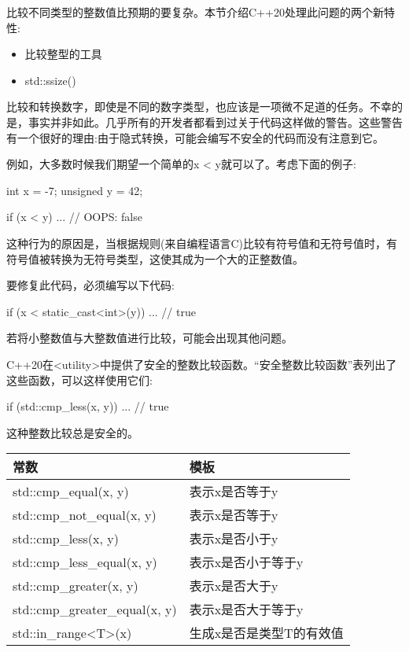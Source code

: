 
比较不同类型的整数值比预期的要复杂。本节介绍C++20处理此问题的两个新特性:

\begin{itemize}
\item 
比较整型的工具

\item 
std::ssize()
\end{itemize}


比较和转换数字，即使是不同的数字类型，也应该是一项微不足道的任务。不幸的是，事实并非如此。几乎所有的开发者都看到过关于代码这样做的警告。这些警告有一个很好的理由:由于隐式转换，可能会编写不安全的代码而没有注意到它。

例如，大多数时候我们期望一个简单的x < y就可以了。考虑下面的例子:

\begin{cpp}
int x = -7;
unsigned y = 42;

if (x < y) ... // OOPS: false
\end{cpp}

这种行为的原因是，当根据规则(来自编程语言C)比较有符号值和无符号值时，有符号值被转换为无符号类型，这使其成为一个大的正整数值。

要修复此代码，必须编写以下代码:

\begin{cpp}
if (x < static_cast<int>(y)) ... // true
\end{cpp}

若将小整数值与大整数值进行比较，可能会出现其他问题。

C++20在<utility>中提供了安全的整数比较函数。“安全整数比较函数”表列出了这些函数，可以这样使用它们:

\begin{cpp}
if (std::cmp_less(x, y)) ... // true
\end{cpp}

这种整数比较总是安全的。

\begin{longtable}[c]{|l|l|}
\hline
\textbf{常数}          & \textbf{模板}                  \\ \hline
\endfirsthead
%
\endhead
%
std::cmp\_equal(x, y)      & 表示x是否等于y     \\ \hline
std::cmp\_not\_equal(x, y) & 表示x是否等于y \\ \hline
std::cmp\_less(x, y)       & 表示x是否小于y    \\ \hline
std::cmp\_less\_equal(x, y)                 & 表示x是否小于等于y    \\ \hline
std::cmp\_greater(x, y)    & 表示x是否大于y \\ \hline
std::cmp\_greater\_equal(x, y)              & 表示x是否大于等于y \\ \hline
std::in\_range\textless{}T\textgreater{}(x) & 生成x是否是类型T的有效值   \\ \hline
\end{longtable}

